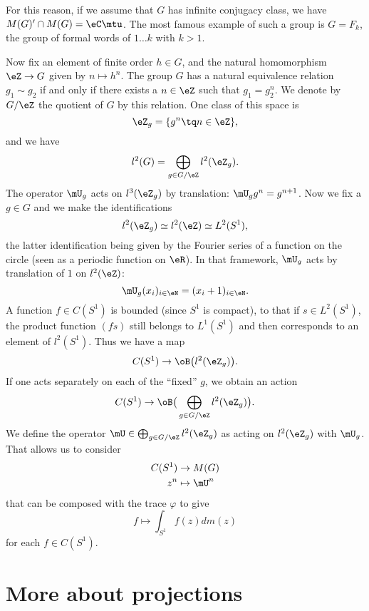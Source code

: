 For this reason, if we assume that $G$ has infinite conjugacy class, we have $M(G)'\cap M(G)=\eC\mtu$. The most famous example of such a group is $G=F_k$, the group of formal words of $1\ldots k$ with $k>1$.

Now fix an element of finite order $h\in G$, and the natural homomorphism $\eZ\to G$ given by $n\mapsto h^n$. The group $G$ has a natural equivalence relation $g_1\sim g_2$ if and only if there exists a $n\in\eZ$ such that $g_1=g_2^n$. We denote by $G/\eZ$ the quotient of $G$ by this relation. One class of this space is
\[ 
  \eZ_{g}=\{ g^n\tq n\in\eZ \},
\]
and we have
\begin{equation}
l^2(G)=\bigoplus_{g\in G/\eZ}l^2(\eZ_g).
\end{equation}
The operator $\mU_g$ acts on $l^3(\eZ_g)$ by translation: $\mU_gg^n=g^{n+1}$. Now we fix a $g\in G$ and we make the identifications
\begin{equation}
l^2(\eZ_g)\simeq l^2(\eZ)\simeq L^2(S^1),
\end{equation}
the latter identification being given by the Fourier series of a function on the circle (seen as a periodic function on $\eR$). In that framework, $\mU_g$ acts by translation of $1$ on $l^2(\eZ)$:
\[ 
  \mU_g(x_i)_{i\in\eN}=(x_i+1)_{i\in\eN}.
\]
A function $f\in C(S^1)$ is bounded (since $S^1$ is compact), to that if $s\in L^2(S^1)$, the product function $(fs)$ still belongs to $L^1(S^1)$ and then corresponds to an element of $l^2(S^1)$. Thus we have a map
\[ 
  C(S^1)\to\oB\big( l^2(\eZ_g) \big).
\]
If one acts separately on each of the ``fixed'' $g$, we obtain an action
\[ 
  C(S^1)\to\oB\big( \bigoplus_{g\in G/\eZ}l^2(\eZ_g) \big).
\]
We define the operator $\mU\in \bigoplus_{g\in G/\eZ}l^2(\eZ_g)  $ as acting on $l^2(\eZ_g)$ with $\mU_g$. That allows us to consider
\begin{equation}
\begin{aligned}
 C(S^1)&\to M(G) \\ 
   z^n&\mapsto \mU^n 
\end{aligned}
\end{equation}
that can be composed with the trace $\varphi$ to give
\[ 
  f\mapsto\int_{S^1} f(z)dm(z)
\]
for each $f\in C(S^1)$.


					\section{More about projections}

